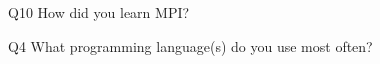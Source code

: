 \begin{description}%
\item{Q10} How did you learn MPI?%
\item{Q4} What programming language(s) do you use most often?%
\end{description}%

